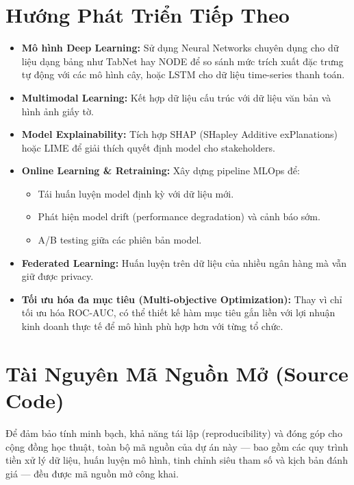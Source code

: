 \section{Hướng Phát Triển Tiếp Theo}

\begin{itemize}

    \item \textbf{Mô hình Deep Learning:} Sử dụng Neural Networks chuyên dụng cho dữ liệu dạng bảng như TabNet hay NODE để so sánh mức trích xuất đặc trưng tự động với các mô hình cây, hoặc LSTM cho dữ liệu time-series thanh toán.
    
    \item \textbf{Multimodal Learning:} Kết hợp dữ liệu cấu trúc với dữ liệu văn bản và hình ảnh giấy tờ.

    \item \textbf{Model Explainability:} Tích hợp SHAP (SHapley Additive exPlanations) hoặc LIME để giải thích quyết định model cho stakeholders.

    \item \textbf{Online Learning \& Retraining:} Xây dựng pipeline MLOps để:
    \begin{itemize}
        \item Tái huấn luyện model định kỳ với dữ liệu mới.
        \item Phát hiện model drift (performance degradation) và cảnh báo sớm.
        \item A/B testing giữa các phiên bản model.
    \end{itemize}

    \item \textbf{Federated Learning:} Huấn luyện trên dữ liệu của nhiều ngân hàng mà vẫn giữ được privacy.
    
    \item \textbf{Tối ưu hóa đa mục tiêu (Multi-objective Optimization):} Thay vì chỉ tối ưu hóa ROC-AUC, có thể thiết kế hàm mục tiêu gắn liền với lợi nhuận kinh doanh thực tế để mô hình phù hợp hơn với từng tổ chức.

\end{itemize}

\section{Tài Nguyên Mã Nguồn Mở (Source Code)}

Để đảm bảo tính minh bạch, khả năng tái lập (reproducibility) và đóng góp cho cộng đồng học thuật, toàn bộ mã nguồn của dự án này --- bao gồm các quy trình tiền xử lý dữ liệu, huấn luyện mô hình, tinh chỉnh siêu tham số và kịch bản đánh giá --- đều được mã nguồn mở công khai.

